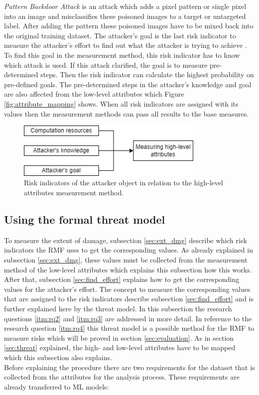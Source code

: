 \textit{Pattern Backdoor Attack} \cite{DBLP:journals/corr/abs-1708-06733} is an attack which adds a pixel pattern or single pixel into an image and misclassifies these poisoned images to a target or untargeted label. After adding the pattern these poisoned images have to be mixed back into the original training dataset. The attacker's goal is the last risk indicator to measure the attacker's effort to find out what the attacker is trying to achieve \cite{DBLP:journals/corr/abs-2012-04884}. To find this goal in the measurement method, this risk indicator has to know which attack is used. If this attack clarified, the goal is to measure pre-determined steps. Then the risk indicator can calculate the highest probability on pre-defined goals. The pre-determined steps in the attacker's knowledge and goal are also affected from the low-level attributes which Figure \ref{fig:attribute_mapping} shows. When all risk indicators are assigned with its values then the measurement methods can pass all results to the base measures.

\begin{figure}[ht!]
  \centering
  \includegraphics[width=9cm]{pictures/measure_effort.png}
  \caption{Risk indicators of the attacker object in relation to the high-level attributes measurement method.}
  \label{fig:measure_effort}
\end{figure}

\subsection{Using the formal threat model}
\label{sec:use_threat_model}

To measure the extent of damage, subsection \ref{sec:ext_dmg} describe which risk indicators the RMF uses to get the corresponding values. As already explained in subsection \ref{sec:ext_dmg}, these values must be collected from the measurement method of the low-level attributes which explains this subsection how this works. After that, subsection \ref{sec:find_effort} explains how to get the corresponding values for the attacker's effort. The concept to measure the corresponding values that are assigned to the risk indicators describe subsection \ref{sec:find_effort} and is further
explained here by the threat model. In this subsection the research questions \ref{itm:rq2} and \ref{itm:rq3} are addressed in more detail. In reference to the research question \ref{itm:rq4} this
threat model is a possible method for the RMF to measure risks which will be proved in section \ref{sec:evaluation}. As in section \ref{sec:threat} explained, the high- and low-level attributes have to be mapped which this subsection also explains. \\
Before explaining the procedure there are two requirements for the dataset that is collected from the attributes \cite{DBLP:conf/crisis/DoynikovaNGK20} for the analysis process. These requirements are already transferred to ML models:

